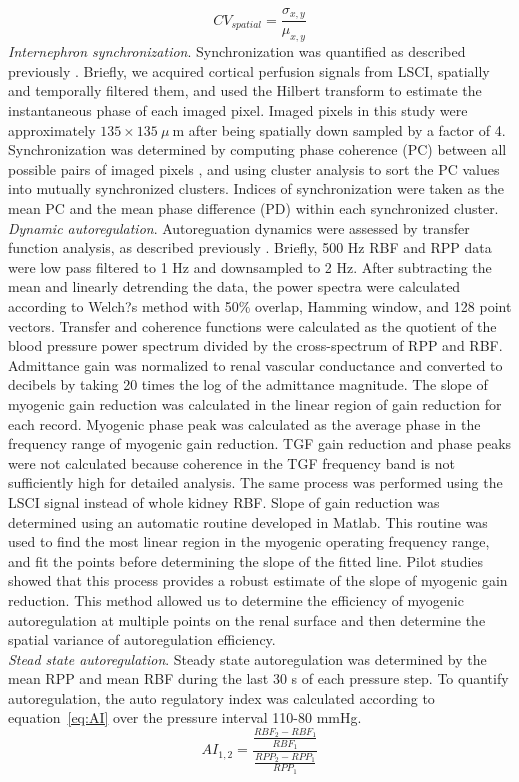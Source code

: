 	\begin{equation}
		CV_{spatial} = \frac{\sigma_{x,y}}{\mu_{x,y}}
		\label{eq:CVspatial}
	\end{equation}
	\emph{Internephron synchronization}. Synchronization was quantified as described previously \cite{Scully14}. Briefly, we acquired cortical perfusion signals from LSCI, spatially and temporally filtered them, and used the Hilbert transform to estimate the instantaneous phase of each imaged pixel. Imaged pixels in this study were approximately $135\times 135 \ \mu \ $m after being spatially down sampled by a factor of 4. Synchronization was determined by computing phase coherence (PC) between all possible pairs of imaged pixels \cite{Scully14}, and using cluster analysis to sort the PC values into mutually synchronized clusters. Indices of synchronization were taken as the mean PC and the mean phase difference (PD) within each synchronized cluster. \\
	\emph{Dynamic autoregulation}. Autoreguation dynamics were assessed by transfer function analysis, as described previously \cite{Wang99,Wang01,Shi06}. Briefly, 500 Hz RBF and RPP data were low pass filtered to 1 Hz and downsampled to 2 Hz. After subtracting the mean and linearly detrending the data, the power spectra were calculated according to Welch?s method with 50\% overlap, Hamming window, and 128 point vectors. Transfer and coherence functions were calculated as the quotient of the blood pressure power spectrum divided by the cross-spectrum of RPP and RBF. Admittance gain was normalized to renal vascular conductance and converted to decibels by taking 20 times the log of the admittance magnitude. The slope of myogenic gain reduction was calculated in the linear region of gain reduction for each record. Myogenic phase peak was calculated as the average phase in the frequency range of myogenic gain reduction. TGF gain reduction and phase peaks were not calculated because coherence in the TGF frequency band is not sufficiently high for detailed analysis. The same process was performed using the LSCI signal instead of whole kidney RBF. Slope of gain reduction was determined using an automatic routine developed in Matlab. This routine was used to find the most linear region in the myogenic operating frequency range, and fit the points before determining the slope of the fitted line. Pilot studies showed that this process provides a robust estimate of the slope of myogenic gain reduction. This method allowed us to determine the efficiency of myogenic autoregulation at multiple points on the renal surface and then determine the spatial variance of autoregulation efficiency. \\
	\emph{Stead state autoregulation}. Steady state autoregulation was determined by the mean RPP and mean RBF during the last 30 s of each pressure step. To quantify autoregulation, the auto regulatory index was calculated according to equation~\ref{eq:AI} over the pressure interval 110-80 mmHg.
	\begin{equation}
	 	AI_{1,2} = \frac{\frac{RBF_2-RBF_1}{RBF_1}}{\frac{RPP_2-RPP_1}{RPP_1}}
		\label{eq:AI}
	\end{equation}
	

